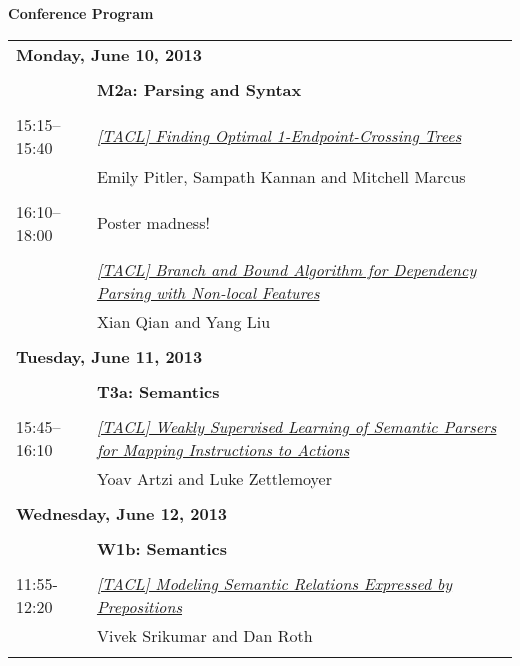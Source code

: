 \setlength{\parindent}{0in}
\setlength{\parskip}{2ex}
\renewcommand{\baselinestretch}{0.87}

\begin{center}
{\Large \bf
  Conference Program
}
\end{center}
\vspace{3mm}
\begin{tabular}{p{20mm}p{128mm}}

\multicolumn{2}{l}{\bf Monday, June 10, 2013} \\
\\
 & {\bf M2a: Parsing and Syntax} \\
\\
15:15--15:40 & \hyperlink{page.1}{\em [TACL] Finding Optimal 1-Endpoint-Crossing Trees}\\
         & Emily Pitler, Sampath Kannan and Mitchell Marcus \\
\\

16:10--18:00 & Poster madness! \\
\\
 & \hyperlink{page.13}{\em [TACL] Branch and Bound Algorithm for Dependency Parsing with Non-local Features}\\
         & Xian Qian and Yang Liu \\
\\

\multicolumn{2}{l}{\bf Tuesday, June 11, 2013} \\
\\
 & {\bf T3a: Semantics} \\
\\
15:45--16:10 & \hyperlink{page.25}{\em [TACL] Weakly Supervised Learning of Semantic Parsers for Mapping Instructions to Actions}\\
         & Yoav Artzi and Luke Zettlemoyer \\
\\

\multicolumn{2}{l}{\bf Wednesday, June 12, 2013} \\
\\
 & {\bf W1b: Semantics} \\
\\
11:55-12:20 & \hyperlink{page.39}{\em [TACL] Modeling Semantic Relations Expressed by Prepositions}\\
         & Vivek Srikumar and Dan Roth \\
\\

\end{tabular}
